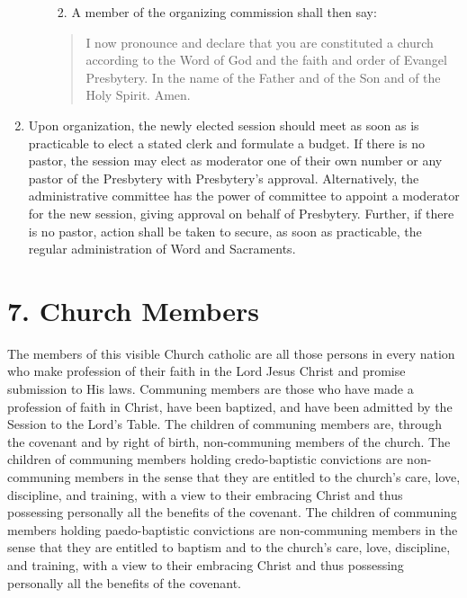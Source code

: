 \documentclass[
]{book}
\providecommand{\tightlist}{%
  \setlength{\itemsep}{0pt}\setlength{\parskip}{0pt}}
\begin{document}
\begin{enumerate}
\begin{enumerate}
    \begin{enumerate}
    \def\labelenumiii{\roman{enumiii}.}
    \setcounter{enumiii}{3}
    \tightlist
    \item
      A member of the organizing commission shall then say:
    \end{enumerate}

    \begin{quote}
    I now pronounce and declare that you are constituted a church according to the Word of God and the faith and order of Evangel Presbytery. In the name of the Father and of the Son and of the Holy Spirit. Amen.
    \end{quote}
  \end{enumerate}
\item
  Upon organization, the newly elected session should meet as soon as is practicable to elect a stated clerk and formulate a budget. If there is no pastor, the session may elect as moderator one of their own number or any pastor of the Presbytery with Presbytery's approval. Alternatively, the administrative committee has the power of committee to appoint a moderator for the new session, giving approval on behalf of Presbytery. Further, if there is no pastor, action shall be taken to secure, as soon as practicable, the regular administration of Word and Sacraments.
\end{enumerate}

\hypertarget{church-members}{%
\section*{7. Church Members}\label{church-members}}

\protect\hypertarget{chapter-slug-7-church-members}{\href{}{}}

\protect\hypertarget{7}{\href{}{}}The members of this visible Church catholic are all those persons in every nation who make profession of their faith in the Lord Jesus Christ and promise submission to His laws. Communing members are those who have made a profession of faith in Christ, have been baptized, and have been admitted by the Session to the Lord's Table. The children of communing members are, through the covenant and by right of birth, non-communing members of the church. The children of communing members holding credo-baptistic convictions are non-communing members in the sense that they are entitled to the church's care, love, discipline, and training, with a view to their embracing Christ and thus possessing personally all the benefits of the covenant. The children of communing members holding paedo-baptistic convictions are non-communing members in the sense that they are entitled to baptism and to the church's care, love, discipline, and training, with a view to their embracing Christ and thus possessing personally all the benefits of the covenant.
\end{document}
